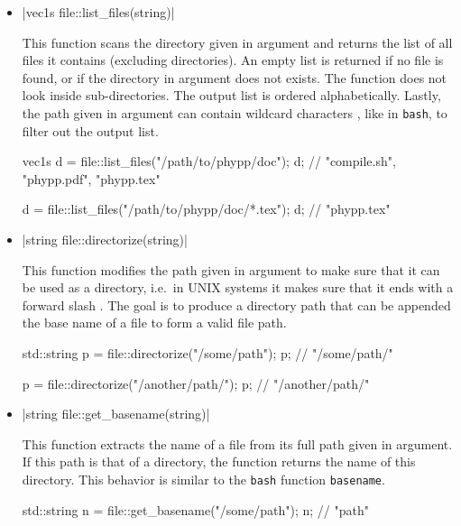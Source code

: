 \documentclass[12pt]{report}
\newcommand*\circled[1]{\tikz[baseline=(char.base)]{
            \node[shape=circle,draw,inner sep=0.0pt] (char) {#1};}}
\newcommand{\vectorfuncsym}{\circled{$\hspace{-1pt}\mathcal{V}$}\xspace}
\newcommand{\vectorfunc}{\vectorfuncsym\hspace{2pt}\xspace}
\newenvironment{example}
{
    \begin{mdframed}[style=example,frametitle={Example}]
}
{
    \end{mdframed}
}
\begin{document}
\begin{itemize}
\item \cppinline|vec1s file::list_files(string)| 

This function scans the directory given in argument and returns the list of all files it contains (excluding directories). An empty list is returned if no file is found, or if the directory in argument does not exists. The function does not look inside sub-directories. The output list is ordered alphabetically. Lastly, the path given in argument can contain wildcard characters \cppinline{*}, like in \texttt{bash}, to filter out the output list.

\begin{example}
\begin{cppcode}
vec1s d = file::list_files("/path/to/phypp/doc");
d; // {"compile.sh", "phypp.pdf", "phypp.tex"}

d = file::list_files("/path/to/phypp/doc/*.tex");
d; // {"phypp.tex"}
\end{cppcode}
\end{example}

\item \vectorfunc \cppinline|string file::directorize(string)| 

This function modifies the path given in argument to make sure that it can be used as a directory, i.e.~in UNIX systems it makes sure that it ends with a forward slash \cppinline{/}. The goal is to produce a directory path that can be appended the base name of a file to form a valid file path.

\begin{example}
\begin{cppcode}
std::string p = file::directorize("/some/path");
p; // "/some/path/"

p = file::directorize("/another/path/");
p; // "/another/path/"
\end{cppcode}
\end{example}

\item \vectorfunc \cppinline|string file::get_basename(string)| 

This function extracts the name of a file from its full path given in argument. If this path is that of a directory, the function returns the name of this directory. This behavior is similar to the \texttt{bash} function \texttt{basename}.

\begin{example}
\begin{cppcode}
std::string n = file::get_basename("/some/path");
n; // "path"


\end{cppcode}
\end{example}
\end{itemize}
\end{document}

